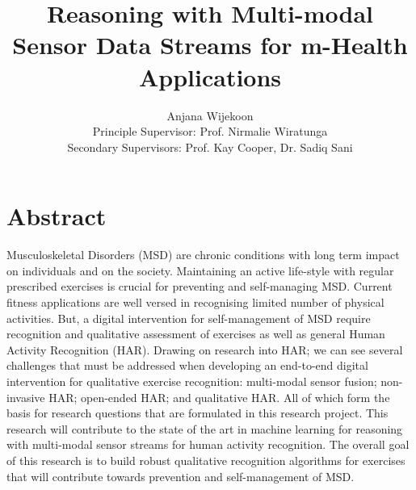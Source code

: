 \documentclass[runningheads]{llncs}
\begin{document}


\title{Reasoning with Multi-modal Sensor Data Streams for m-Health Applications}
\author{Anjana Wijekoon\\
Principle Supervisor: Prof. Nirmalie Wiratunga\\
Secondary Supervisors: Prof. Kay Cooper, Dr. Sadiq Sani}
\maketitle

\section*{Abstract}
Musculoskeletal Disorders (MSD) are chronic conditions with long term impact on individuals and on the society.
Maintaining an active life-style with regular prescribed exercises is crucial for preventing and self-managing MSD. 
Current fitness applications are well versed in recognising limited number of physical activities. 
But, a digital intervention for self-management of MSD require recognition and qualitative assessment of exercises as well as general Human Activity Recognition (HAR).
Drawing on research into HAR; we can see several challenges that must be addressed when developing an end-to-end digital intervention for qualitative exercise recognition: multi-modal sensor fusion; non-invasive HAR; open-ended HAR; and qualitative HAR.
All of which form the basis for research questions that are formulated in this research project.
This research will contribute to the state of the art in machine learning for reasoning with multi-modal sensor streams for human activity recognition.
The overall goal of this research is to build robust qualitative recognition algorithms for exercises that will contribute towards prevention and self-management of MSD. 

\clearpage
\end{document}
